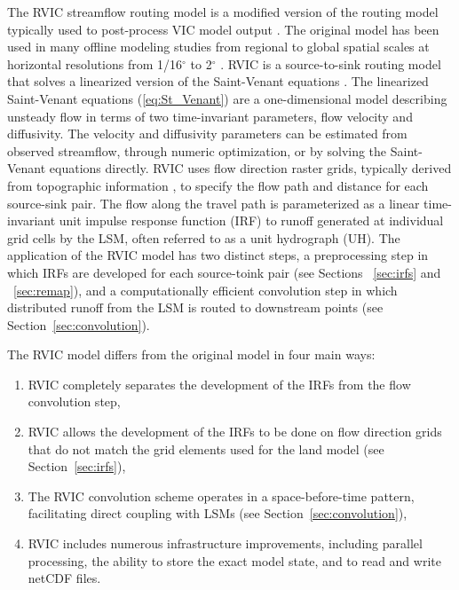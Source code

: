 \documentclass[jgrga, draft]{agutex}
\begin{document}
\begin{article}
The RVIC streamflow routing model is a modified version of the routing model typically used to post-process VIC model output \citep{Lohmann_1996, Lohmann_1998a}.
The original \citet{Lohmann_1996} model has been used in many offline modeling studies from regional to global spatial scales at horizontal resolutions from 1/16$^{\circ}$ to 2$^{\circ}$ \citep[e.g.][]{Nijssen_1997,Lohmann_1998b,Su_2005,Hamlet_2013}.
RVIC is a source-to-sink routing model that solves a linearized version of the Saint-Venant equations \citep{Fread_1992,Mesa_1986}.
The linearized Saint-Venant equations (\ref{eq:St_Venant}) are a one-dimensional model describing unsteady flow in terms of two time-invariant parameters, flow velocity and diffusivity.
The velocity and diffusivity parameters can be estimated from observed streamflow, through numeric optimization, or by solving the Saint-Venant equations directly. %
RVIC uses flow direction raster grids, typically derived from topographic information \citep[e.g.][]{Wu_2011}, to specify the flow path and distance for each source-sink pair.
The flow along the travel path is parameterized as a linear time-invariant unit impulse response function (IRF) to runoff generated at individual grid cells by the LSM, often referred to as a unit hydrograph (UH).
The application of the RVIC model has two distinct steps, a preprocessing step in which IRFs are developed for each source-toink pair (see Sections ~\ref{sec:irfs} and ~\ref{sec:remap}), and a computationally efficient convolution step in which distributed runoff from the LSM is routed to downstream points (see Section~\ref{sec:convolution}).

The RVIC model differs from the original \citet{Lohmann_1996} model in four main ways:

\begin{enumerate}
\item RVIC completely separates the development of the IRFs from the flow convolution step,
\item RVIC allows the development of the IRFs to be done on flow direction grids that do not match the grid elements used for the land model (see Section~\ref{sec:irfs}),
\item The RVIC convolution scheme operates in a space-before-time pattern, facilitating direct coupling with LSMs (see Section~\ref{sec:convolution}),
\item RVIC includes numerous infrastructure improvements, including parallel processing, the ability to store the exact model state, and to read and write netCDF files.
\end{enumerate}


\end{article}
\end{document}

